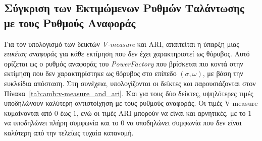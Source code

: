 \subsection{Σύγκριση των Εκτιμώμενων Ρυθμών Ταλάντωσης με τους Ρυθμούς Αναφοράς}
Για τον υπολογισμό των δεικτών \textenglish{\textit{V-measure}} και ARI, απαιτείται η ύπαρξη μιας \textit{ετικέτας αναφοράς} για κάθε εκτίμηση που δεν έχει χαρακτηριστεί ως θόρυβος. Αυτό ορίζεται ως ο ρυθμός αναφοράς του \textenglish{\textit{PowerFactory}} που βρίσκεται πιο κοντά στην εκτίμηση που δεν χαρακτηρίστηκε ως θόρυβος στο επίπεδο $(\sigma,\omega)$, με βάση την ευκλείδια απόσταση. Στη συνέχεια, υπολογίζονται οι δείκτες και παρουσιάζονται στον Πίνακα~\ref{tab:amb:v-measure_and_ari}. Και για τους δύο δείκτες, υψηλότερες τιμές υποδηλώνουν καλύτερη αντιστοίχηση με τους ρυθμούς αναφοράς. Οι τιμές V-measure κυμαίνονται από $0$ έως $1$, ενώ οι τιμές ARI μπορούν να είναι και αρνητικές, με το $1$ να υποδηλώνει πλήρη συμφωνία και το $0$ να υποδηλώνει συμφωνία που δεν είναι καλύτερη από την τελείως τυχαία κατανομή.


